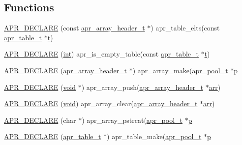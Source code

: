\subsection*{Functions}
\begin{DoxyCompactItemize}
\item 
\hyperlink{group__apr__tables_ga9511e4ca61f34976bb986a3c46b589de}{A\+P\+R\+\_\+\+D\+E\+C\+L\+A\+RE} (const \hyperlink{structapr__array__header__t}{apr\+\_\+array\+\_\+header\+\_\+t} $\ast$) apr\+\_\+table\+\_\+elts(const \hyperlink{structapr__table__t}{apr\+\_\+table\+\_\+t} $\ast$\hyperlink{pcretest_8txt_a9ffb27fb8e1f90c17b13303fee2fb883}{t})
\item 
\hyperlink{group__apr__tables_ga24a036e42e589a90022bf1ec1158113b}{A\+P\+R\+\_\+\+D\+E\+C\+L\+A\+RE} (\hyperlink{pcre_8txt_a42dfa4ff673c82d8efe7144098fbc198}{int}) apr\+\_\+is\+\_\+empty\+\_\+table(const \hyperlink{structapr__table__t}{apr\+\_\+table\+\_\+t} $\ast$\hyperlink{pcretest_8txt_a9ffb27fb8e1f90c17b13303fee2fb883}{t})
\item 
\hyperlink{group__apr__tables_gaae3cc795193b58c8995d1bc65c7851b3}{A\+P\+R\+\_\+\+D\+E\+C\+L\+A\+RE} (\hyperlink{structapr__array__header__t}{apr\+\_\+array\+\_\+header\+\_\+t} $\ast$) apr\+\_\+array\+\_\+make(\hyperlink{structapr__pool__t}{apr\+\_\+pool\+\_\+t} $\ast$\hyperlink{group__APACHE__CORE__MPM_ga5cd91701e5c167f2b1a38e70ab57817e}{p}
\item 
\hyperlink{group__apr__tables_ga2de0308124f1ed080a6c373e993b5cae}{A\+P\+R\+\_\+\+D\+E\+C\+L\+A\+RE} (\hyperlink{group__MOD__ISAPI_gacd6cdbf73df3d9eed42fa493d9b621a6}{void} $\ast$) apr\+\_\+array\+\_\+push(\hyperlink{structapr__array__header__t}{apr\+\_\+array\+\_\+header\+\_\+t} $\ast$\hyperlink{group__apr__tables_ga1e3f66bfb173c9a913ef3bb37842e273}{arr})
\item 
\hyperlink{group__apr__tables_ga147e24e5f1f9f5bb7d7d11381291bba5}{A\+P\+R\+\_\+\+D\+E\+C\+L\+A\+RE} (\hyperlink{group__MOD__ISAPI_gacd6cdbf73df3d9eed42fa493d9b621a6}{void}) apr\+\_\+array\+\_\+clear(\hyperlink{structapr__array__header__t}{apr\+\_\+array\+\_\+header\+\_\+t} $\ast$\hyperlink{group__apr__tables_ga1e3f66bfb173c9a913ef3bb37842e273}{arr})
\item 
\hyperlink{group__apr__tables_ga76c651e5101e99d13ab524734b2cead1}{A\+P\+R\+\_\+\+D\+E\+C\+L\+A\+RE} (char $\ast$) apr\+\_\+array\+\_\+pstrcat(\hyperlink{structapr__pool__t}{apr\+\_\+pool\+\_\+t} $\ast$\hyperlink{group__APACHE__CORE__MPM_ga5cd91701e5c167f2b1a38e70ab57817e}{p}
\item 
\hyperlink{group__apr__tables_ga2fd1a47e4d1d3dc2eec1ffec470a0f30}{A\+P\+R\+\_\+\+D\+E\+C\+L\+A\+RE} (\hyperlink{structapr__table__t}{apr\+\_\+table\+\_\+t} $\ast$) apr\+\_\+table\+\_\+make(\hyperlink{structapr__pool__t}{apr\+\_\+pool\+\_\+t} $\ast$\hyperlink{group__APACHE__CORE__MPM_ga5cd91701e5c167f2b1a38e70ab57817e}{p}

\end{DoxyCompactItemize}
